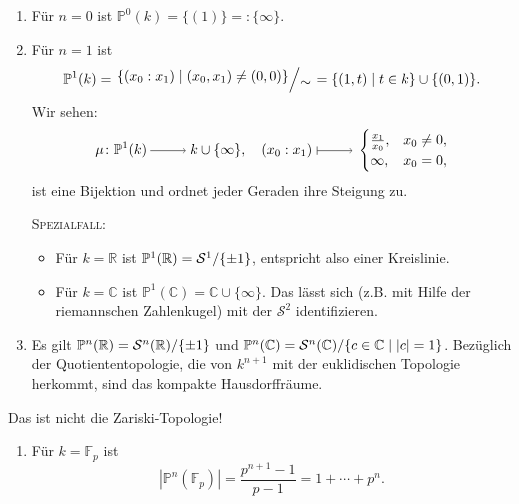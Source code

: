 \documentclass[a4paper,12pt,index=toc]{scrbook}
\theoremstyle{keinenummern} %
\def\C{\mathbb{C}}
\def\P{\mathbb{P}}
\def\S{\mathcal{S}}
\newcommand{\FF}{\mathbb{F}}
\newcommand{\card}[1]{|#1|}
\newcommand{\set}[1]{\ensuremath{\mathbb{#1}}}
\newcommand{\R}{\set{R}}
\begin{document}
\begin{bsp}\label{2.2.2}\begin{enumerate}
\item Für $n=0$ ist $\P^{0}(k) = \{(1)\} =: \{\infty\}$.
\item Für $n=1$ ist \[\P^{1}(k)=\Quotient{\{(x_{0}:x_{1})\mid(x_{0},x_{1})\neq(0,0)\}}{\sim}=\{(1,t)\mid t\in k\}\cup\{(0,1)\}.\] \vspace*{-6pt}Wir sehen:\vspace*{-12pt}
\[\mu\colon\P^{1}(k)\ra k\cup\{\infty\},\quad(x_{0}:x_{1})\mapsto\begin{cases}\frac{x_{1}}{x_{0}},&x_{0}\neq0,\\\infty,&x_{0}=0,\\\end{cases}\]
ist eine Bijektion und ordnet jeder Geraden ihre Steigung zu.

{\scshape Spezialfall:}\begin{itemize}\item Für $k=\R$ ist $\P^{1}(\R)=\Quotient{\S^{1}}{\{\pm1\}}$, entspricht also einer Kreislinie.
\item Für $k=\C$ ist $\P^{1}(\C)=\C\cup\{\infty\}$. Das lässt sich (z.B. mit Hilfe der riemannschen Zahlenkugel) mit der $\S^{2}$ identifizieren.
\end{itemize}
\item Es gilt $\P^{n}(\R)=\Quotient{\S^{n}(\R)}{\{\pm1\}}$ und $\P^{n}(\C)=\Quotient{\S^{n}(\C)}{\{c\in\C\mid |c|=1\}}$. Bezüglich der Quotiententopologie, die von $k^{n+1}$ mit der euklidischen Topologie herkommt, sind das kompakte Hausdorffräume.
\end{enumerate}
\begin{w}Das ist nicht die Zariski-Topologie!\end{w}
\begin{enumerate}[resume]
\item Für $k=\FF_{p}$ ist
\[\card{\P^{n}(\FF_{p})}=\frac{p^{n+1}-1}{p-1}=1+\dotsm+p^{n}.\]
\end{enumerate}\end{bsp}
\end{document}
